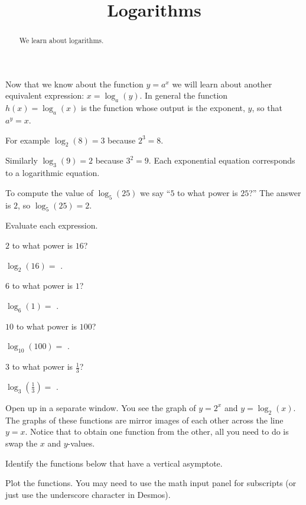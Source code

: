 \documentclass{ximera}
\title{Logarithms}
\begin{document}
\begin{abstract}
We learn about logarithms.
\end{abstract}
\maketitle

Now that we know about the function $y=a^x$ we will learn about another equivalent expression: $x=\log_a(y)$. In general the function $h(x)=\log_a(x)$ is the function whose output is the exponent, $y$, so that $a^y=x$.

For example $\log_2(8)=3$ because $2^3=8$. 

Similarly $\log_3(9)=2$ because $3^2=9$. Each exponential equation corresponds to a logarithmic equation. 

To compute the value of $\log_5(25)$ we say ``$5$ to what power is $25$?'' The answer is $2$, so $\log_5(25)=2$.

\begin{question}
Evaluate each expression.

\begin{hint}
$2$ to what power is $16$? 
\end{hint}
$\log_2(16)=$ .
\begin{hint}
$6$ to what power is $1$? 
\end{hint}
$\log_6(1)=$ .
\begin{hint}
$10$ to what power is $100$? 
\end{hint}
$\log_{10}(100)=$ .
\begin{hint}
$3$ to what power is $\frac{1}{3}$? 
\end{hint}
$\log_{3}\left(\frac{1}{3}\right)=$ .

\end{question}



Open up  in a separate window. You see the graph of $y=2^x$ and $y=\log_2(x)$. The graphs of these functions are mirror images of each other across the line $y=x$. Notice that to obtain one function from the other, all you need to do is swap the $x$ and $y$-values. 

\begin{question}
Identify the functions below that have a vertical asymptote.

    \begin{hint}
      Plot the functions. You may need to use the math input panel for subscripts (or just use the underscore character in Desmos).
    \end{hint}
    \begin{multipleChoice}
    \end{multipleChoice}

\end{question}
\end{document}
